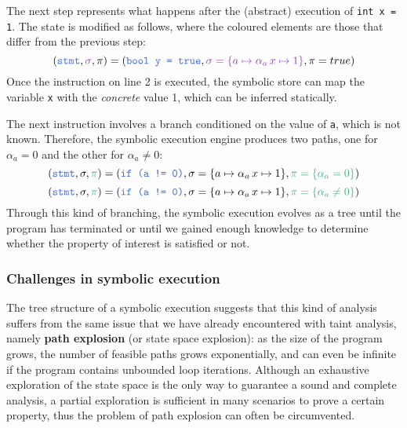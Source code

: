 \documentclass[12pt,a4paper]{book}
\theoremstyle{definition}
\begin{document}
	The next step represents what happens after the (abstract) execution of \texttt{int x = 1}. The state is modified as follows, where the coloured elements are those that differ from the previous step:
	\[
	(\textcolor{blue}{\texttt{stmt}}, \textcolor{violet}{\sigma}, \pi) = (\textcolor{blue}{\texttt{bool y = true}}, \textcolor{violet}{\sigma = \{a \mapsto \alpha_a\, x \mapsto 1\}}, \pi = true)
	\] 
	Once the instruction on line 2 is executed, the symbolic store can map the variable \texttt{x} with the \textit{concrete} value 1, which can be inferred statically.
	
	The next instruction involves a branch conditioned on the value of \texttt{a}, which is not known. Therefore, the symbolic execution engine produces two paths, one for $\alpha_a = 0$ and the other for $\alpha_a \neq 0$:
	\[
	(\textcolor{blue}{\texttt{stmt}}, \sigma, \textcolor{green}{\pi}) = (\textcolor{blue}{\texttt{if (a != 0)}}, \sigma = \{a \mapsto \alpha_a\, x \mapsto 1\}, \textcolor{green}{\pi = \{\alpha_a = 0\}})
	\]
	\[
	(\textcolor{blue}{\texttt{stmt}}, \sigma, \textcolor{green}{\pi}) = (\textcolor{blue}{\texttt{if (a != 0)}}, \sigma = \{a \mapsto \alpha_a\, x \mapsto 1\}, \textcolor{green}{\pi = \{\alpha_a \neq 0\}})
	\]
	Through this kind of branching, the symbolic execution evolves as a tree until the program has terminated or until we gained enough knowledge to determine whether the property of interest is satisfied or not.
	\subsubsection{Challenges in symbolic execution}
	The tree structure of a symbolic execution suggests that this kind of analysis suffers from the same issue that we have already encountered with taint analysis, namely \textbf{path explosion} (or state space explosion): as the size of the program grows, the number of feasible paths grows exponentially, and can even be infinite if the program contains unbounded loop iterations. Although an exhaustive exploration of the state space is the only way to guarantee a sound and complete analysis, a partial exploration is sufficient in many scenarios to prove a certain property, thus the problem of path explosion can often be circumvented.
	
\end{document}
